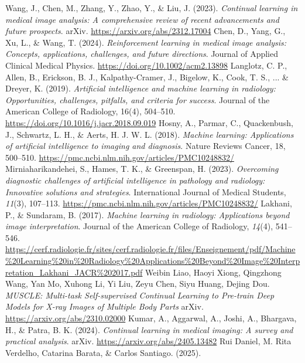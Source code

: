 \documentclass{IEEEcsmag}
\begin{document}
\begin{thebibliography}{31}
        Wang, J., Chen, M., Zhang, Y., Zhao, Y., \& Liu, J. (2023). \textit{Continual learning in medical image analysis: A comprehensive review of recent advancements and future prospects}. arXiv. \url{https://arxiv.org/abs/2312.17004}
        Chen, D., Yang, G., Xu, L., \& Wang, T. (2024). \textit{Reinforcement learning in medical image analysis: Concepts, applications, challenges, and future directions}. Journal of Applied Clinical Medical Physics. \url{https://doi.org/10.1002/acm2.13898}
        Langlotz, C. P., Allen, B., Erickson, B. J., Kalpathy-Cramer, J., Bigelow, K., Cook, T. S., ... \& Dreyer, K. (2019). \textit{Artificial intelligence and machine learning in radiology: Opportunities, challenges, pitfalls, and criteria for success}. Journal of the American College of Radiology, 16(4), 504–510. \url{https://doi.org/10.1016/j.jacr.2018.09.019}
        Hosny, A., Parmar, C., Quackenbush, J., Schwartz, L. H., \& Aerts, H. J. W. L. (2018). \textit{Machine learning: Applications of artificial intelligence to imaging and diagnosis}. Nature Reviews Cancer, 18, 500–510. \url{https://pmc.ncbi.nlm.nih.gov/articles/PMC10248832/}
        Mirniaharikandehei, S., Hames, T. K., \& Greenspan, H. (2023). \textit{Overcoming diagnostic challenges of artificial intelligence in pathology and radiology: Innovative solutions and strategies}. International Journal of Medical Students, \textit{11}(3), 107--113. \url{https://pmc.ncbi.nlm.nih.gov/articles/PMC10248832/}
        Lakhani, P., \& Sundaram, B. (2017). \textit{Machine learning in radiology: Applications beyond image interpretation}. Journal of the American College of Radiology, \textit{14}(4), 541--546. \url{https://cerf.radiologie.fr/sites/cerf.radiologie.fr/files/Enseignement/pdf/Machine%20Learning%20in%20Radiology%20Applications%20Beyond%20Image%20Interpretation_Lakhani_JACR%202017.pdf}
        Weibin Liao, Haoyi Xiong, Qingzhong Wang, Yan Mo, Xuhong Li, Yi Liu, Zeyu Chen, Siyu Huang, Dejing Dou. 
        \textit{MUSCLE: Multi-task Self-supervised Continual Learning to Pre-train Deep Models for X-ray Images of Multiple Body Parts}
        arXiv. \url{https://arxiv.org/abs/2310.02000}
        Kumar, A., Aggarwal, A., Joshi, A., Bhargava, H., \& Patra, B. K. (2024). \textit{Continual learning in medical imaging: A survey and practical analysis}. arXiv. \url{https://arxiv.org/abs/2405.13482}
        Rui Daniel, M. Rita Verdelho, Catarina Barata, \& Carlos Santiago. (2025). 

\end{thebibliography}
\end{document}
